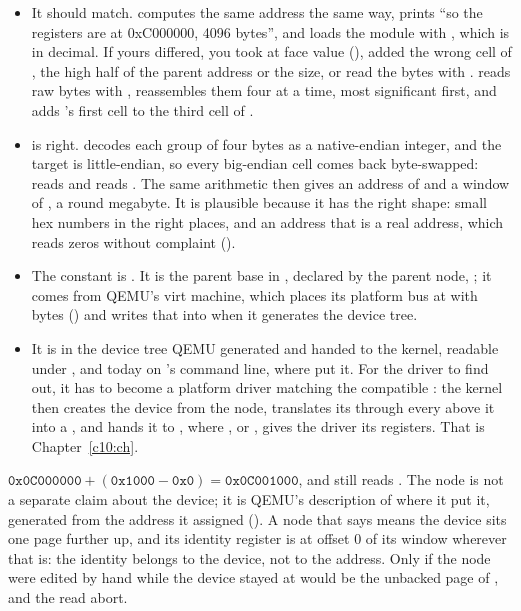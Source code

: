 \begin{itemize}
  \item It should match.  computes the same address the same way, prints ``so the
    registers are at 0xC000000, 4096 bytes'', and loads the module with ,
    which is  in decimal. If yours differed, you took  at face value
    (), added the wrong cell of , the high half of the parent address or the
    size, or read the bytes with .  reads raw bytes with ,
    reassembles them four at a time, most significant first, and adds 's first cell to
    the third cell of .
  \item {} is right.  decodes each group of four bytes as a native-endian
    integer, and the target is little-endian, so every big-endian cell comes back byte-swapped:
     reads  and  reads . The same arithmetic then gives an address of  and a window of
    , a round megabyte. It is plausible because it has the right shape: small hex
    numbers in the right places, and an address that is a real address, which reads zeros without
    complaint ().
  \item The constant is . It is the parent base in , declared by the
    parent node, ; it comes from QEMU's virt machine, which places its
    platform bus at  with  bytes () and
    writes that into  when it generates the device tree.
  \item It is in the device tree QEMU generated and handed to the kernel, readable under
    , and today on 's command line, where
     put it. For the driver to find out, it has to become a platform driver matching
    the compatible : the kernel then creates the device from the node,
    translates its  through every  above it into a ,
    and hands it to , where , or
    , gives the driver its registers. That is
    Chapter~\ref{c10:ch}.
\end{itemize}

 $\texttt{0x0C000000} + (\texttt{0x1000} - \texttt{0x0}) = \texttt{0x0C001000}$, and
 still reads . The node is not a separate claim about the device;
it is QEMU's description of where it put it, generated from the address it assigned
(). A node that says  means the device sits one page
further up, and its identity register is at offset 0 of its window wherever that is: the identity
belongs to the device, not to the address. Only if the node were edited by hand while the device
stayed at  would  be the unbacked page of , and
the read abort.
